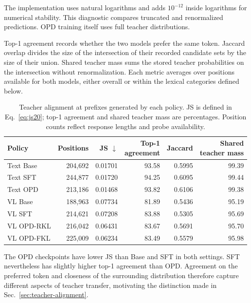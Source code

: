 \documentclass[]{jingdong}
\theoremstyle{plain}
\theoremstyle{definition}
\theoremstyle{remark}
\begin{document}
The implementation uses natural logarithms and adds $10^{-12}$ inside logarithms for numerical stability. This diagnostic compares truncated and renormalized predictions. OPD training itself uses full teacher distributions.

Top-1 agreement records whether the two models prefer the same token. Jaccard overlap divides the size of the intersection of their recorded candidate sets by the size of their union. Shared teacher mass sums the stored teacher probabilities on the intersection without renormalization. Each metric averages over positions available for both models, either overall or within the lexical categories defined below.

\begin{table}[H]
\centering
\small
\caption{Teacher alignment at prefixes generated by each policy. JS is defined in Eq.~\ref{eq:js20}; top-1 agreement and shared teacher mass are percentages. Position counts reflect response lengths and probe availability.}
\label{tab:app-local-compatibility}
\setlength{\tabcolsep}{3pt}
\renewcommand{\arraystretch}{1.08}
\begin{tabular*}{\linewidth}{@{\extracolsep{\fill}}lrrrrr@{}}
\toprule
Policy & Positions & JS $\downarrow$ & \shortstack{Top-1\\agreement} & Jaccard & \shortstack{Shared\\teacher mass} \\
\midrule
Text Base & 204,692 & 0.01701 & 93.58 & 0.5995 & 99.39 \\
Text SFT & 244,877 & 0.01720 & 94.25 & 0.6095 & 99.44 \\
Text OPD & 213,186 & 0.01468 & 93.82 & 0.6106 & 99.38 \\
\midrule
VL Base & 188,963 & 0.07734 & 81.89 & 0.5436 & 95.19 \\
VL SFT & 214,621 & 0.07208 & 83.88 & 0.5305 & 95.69 \\
VL OPD-RKL & 216,042 & 0.06431 & 83.67 & 0.5691 & 95.70 \\
VL OPD-FKL & 225,009 & 0.06234 & 83.49 & 0.5579 & 95.98 \\
\bottomrule
\end{tabular*}
\end{table}


The OPD checkpoints have lower JS than Base and SFT in both settings. SFT nevertheless has slightly higher top-1 agreement than OPD. Agreement on the preferred token and closeness of the surrounding distribution therefore capture different aspects of teacher transfer, motivating the distinction made in Sec.~\ref{sec:teacher-alignment}.
\end{document}
